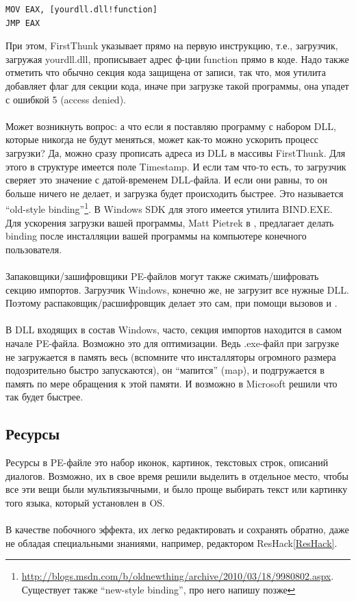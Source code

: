 \begin{lstlisting}
MOV EAX, [yourdll.dll!function]
JMP EAX
\end{lstlisting}

При этом, FirstThunk указывает прямо на первую инструкцию, т.е., загрузчик, загружая yourdll.dll, прописывает адрес
ф-ции function прямо в коде. Надо также отметить что обычно секция кода защищена от записи, так что, моя утилита
добавляет флаг  для секции кода, иначе при загрузке такой программы, она упадет с
ошибкой 5 (access denied). \\
\\
Может возникнуть вопрос: а что если я поставляю программу с набором DLL, которые никогда не будут меняться,
может как-то можно ускорить процесс загрузки? Да, можно сразу прописать адреса из DLL в массивы FirstThunk.
Для этого в структуре  имеется поле Timestamp. И если там что-то есть, то загрузчик
сверяет это значение с датой-временем DLL-файла. И если они равны, то он больше ничего не делает, и загрузка будет
происходить быстрее. 
Это называется ``old-style binding''\footnote{\url{http://blogs.msdn.com/b/oldnewthing/archive/2010/03/18/9980802.aspx}. Существует также ``new-style binding'', про него напишу позже}.
В Windows SDK для этого имеется утилита BIND.EXE.
Для ускорения загрузки вашей программы, Matt Pietrek в \cite{Pietrek1}, предлагает делать binding после инсталляции
вашей программы на компьютере конечного пользователя. \\
\\
Запаковщики/зашифровщики PE-файлов могут также сжимать/шифровать секцию импортов. Загрузчик Windows,
конечно же, не загрузит все нужные DLL. Поэтому распаковщик/расшифровщик делает это сам, при помощи
вызовов  и . \\
\\
В DLL входящих в состав Windows, часто, секция импортов находится в самом начале PE-файла.
Возможно это для оптимизации.
Ведь .exe-файл при загрузке не загружается в память весь (вспомните что инсталляторы огромного размера подозрительно
быстро запускаются), он ``мапится'' (map), и подгружается в память по мере
обращения к этой памяти. И возможно в Microsoft решили что так будет быстрее.

\subsection{Ресурсы}

Ресурсы в PE-файле это набор иконок, картинок, текстовых строк, описаний диалогов.
Возможно, их в свое время решили выделить в отдельное место, чтобы все эти вещи были мультиязычными,
и было проще выбирать текст или картинку того языка, который установлен в \ac{OS}. \\
\\
В качестве побочного эффекта, их легко редактировать и сохранять обратно, даже не обладая специальными знаниями,
например, редактором ResHack\ref{ResHack}.

